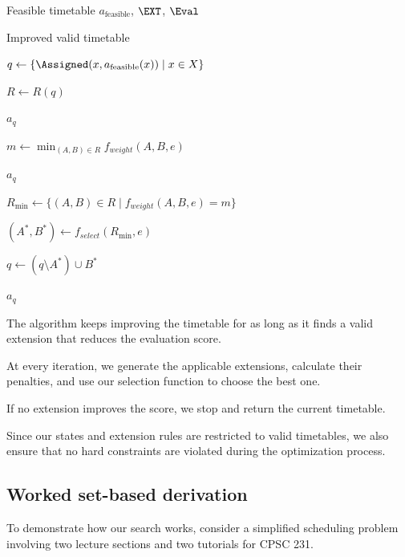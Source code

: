 \begin{algorithm}[H]
\caption{Set-Based Optimization}
\begin{algorithmic}[1]

\Require Feasible timetable
$a_{\mathrm{feasible}}$, $\EXT$, $\Eval$

\Ensure Improved valid timetable

\State $q\gets
\{\Assigned(x,a_{\mathrm{feasible}}(x))
\mid x\in X\}$


    \State $R\gets R(q)$

        \State \Return $a_q$
    \EndIf

    \State $m\gets
    \min_{(A,B)\in R}
    f_{weight}(A,B,e)$

        \State \Return $a_q$
    \EndIf

    \State $R_{\min}\gets
    \{(A,B)\in R\mid
    f_{weight}(A,B,e)=m\}$

    \State $(A^*,B^*)\gets
    f_{select}(R_{\min},e)$

    \State $q\gets
    (q\setminus A^*)\cup B^*$

\EndWhile

\State \Return $a_q$

\end{algorithmic}
\end{algorithm}

The algorithm keeps improving the timetable for as long as it finds a valid extension that reduces the evaluation score.

At every iteration, we generate the applicable extensions, calculate their penalties, and use our selection function to choose the best one.

If no extension improves the score, we stop and return the current timetable.

Since our states and extension rules are restricted to valid timetables, we also ensure that no hard constraints are violated during the optimization process.

\subsection{Worked set-based derivation}

To demonstrate how our search works, consider a simplified scheduling problem involving two lecture sections and two tutorials for CPSC 231.


